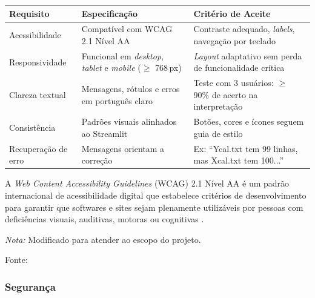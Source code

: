 \begin{quadro}[ht]
\begin{center}
\small
\captionsetup{justification=centering, labelsep=endash, width=0.75\linewidth}
\caption{Requisitos de usabilidade do sistema.}
\label{tab:usabilidade}
\begin{threeparttable}
\begin{tabularx}{\textwidth}{|l|X|X|} \hline
\textbf{Requisito} & \textbf{Especificação} & \textbf{Critério de Aceite} \\ \hline
Acessibilidade & Compatível com \gls{WCAG} 2.1 Nível AA\tnote{a} & Contraste adequado, \textit{labels}, navegação por teclado \\ \hline
Responsividade & Funcional em \textit{desktop}, \textit{tablet} e \textit{mobile} ($\geq$ 768\,px) & \textit{Layout} adaptativo sem perda de funcionalidade crítica \\ \hline
Clareza textual & Mensagens, rótulos e erros em português claro & Teste com 3 usuários: $\geq$ 90\% de acerto na interpretação \\ \hline
Consistência & Padrões visuais alinhados ao Streamlit & Botões, cores e ícones seguem guia de estilo \\ \hline
Recuperação de erro & Mensagens orientam a correção & Ex: ``Ycal.txt tem 99 linhas, mas Xcal.txt tem 100...'' \\ \hline
\end{tabularx}
\begin{tablenotes}[flushleft]
\footnotesize
\item[a] A \textit{Web Content Accessibility Guidelines} (WCAG) 2.1 Nível AA é um padrão internacional de acessibilidade digital que estabelece critérios de desenvolvimento para garantir que softwares e sites sejam plenamente utilizáveis por pessoas com deficiências visuais, auditivas, motoras ou cognitivas \cite{w3c_wcag21_ptbr}.
\item \textit{Nota:} Modificado para atender ao escopo do projeto.
\item Fonte:~\oautor
\end{tablenotes}
\end{threeparttable}
\end{center}
\end{quadro}


\subsubsection{Segurança}
\label{ssubsec:seguranca}


